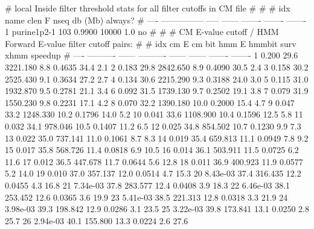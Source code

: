 \begin{sreoutput}
# local Inside filter threshold stats for all filter cutoffs in CM file
#
#
#  idx  name              clen       F     nseq  db (Mb)  always?
# ----  ---------------  -----  ------  -------  -------  -------
     1  purine1p2-1        103  0.9900    10000      1.0       no
#
#
#       CM E-value cutoff / HMM Forward E-value filter cutoff pairs:
#
#       idx         cm E  cm bit       hmm E  hmmbit    surv     xhmm  speedup
#       ----  ----------  ------  ----------  ------  ------  -------  -------
           1       0.200    29.6    3221.180     8.8  0.4635     34.4      2.1
           2       0.183    29.8    2842.650     8.9  0.4090     30.5      2.4
           3       0.158    30.2    2525.430     9.1  0.3634     27.2      2.7
           4       0.134    30.6    2215.290     9.3  0.3188     24.0      3.0
           5       0.115    31.0    1932.870     9.5  0.2781     21.1      3.4
           6       0.092    31.5    1739.130     9.7  0.2502     19.1      3.8
           7       0.079    31.9    1550.230     9.8  0.2231     17.1      4.2
           8       0.070    32.2    1390.180    10.0  0.2000     15.4      4.7
           9       0.047    33.2    1248.330    10.2  0.1796     14.0      5.2
          10       0.041    33.6    1108.900    10.4  0.1596     12.5      5.8
          11       0.032    34.1     978.046    10.5  0.1407     11.2      6.5
          12       0.025    34.8     854.502    10.7  0.1230      9.9      7.3
          13       0.022    35.0     737.141    11.0  0.1061      8.7      8.3
          14       0.019    35.4     659.813    11.1  0.0949      7.8      9.2
          15       0.017    35.8     568.726    11.4  0.0818      6.9     10.5
          16       0.014    36.1     503.911    11.5  0.0725      6.2     11.6
          17       0.012    36.5     447.678    11.7  0.0644      5.6     12.8
          18       0.011    36.9     400.923    11.9  0.0577      5.2     14.0
          19       0.010    37.0     357.137    12.0  0.0514      4.7     15.3
          20    8.43e-03    37.4     316.435    12.2  0.0455      4.3     16.8
          21    7.34e-03    37.8     283.577    12.4  0.0408      3.9     18.3
          22    6.46e-03    38.1     253.452    12.6  0.0365      3.6     19.9
          23    5.41e-03    38.5     221.313    12.8  0.0318      3.3     21.9
          24    3.98e-03    39.3     198.842    12.9  0.0286      3.1     23.5
          25    3.22e-03    39.8     173.841    13.1  0.0250      2.8     25.7
          26    2.94e-03    40.1     155.800    13.3  0.0224      2.6     27.6

\end{sreoutput}
